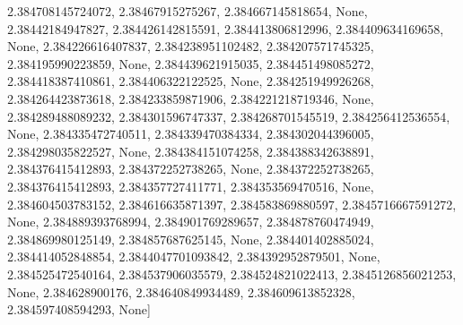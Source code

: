 \documentclass[
  11pt,
  french,
]{article}
\begin{document}
\begin{tcolorbox}[title= Répartition des volumes selon leurs caractéristiques ,colback=boitecode]
2.384708145724072, 2.38467915275267, 2.384667145818654, None, 2.38442184947827, 2.384426142815591, 2.384413806812996, 2.384409634169658, None, 2.384226616407837, 2.384238951102482, 2.384207571745325, 2.384195990223859, None, 2.384439621915035, 2.384451498085272, 2.384418387410861, 2.384406322122525, None, 2.384251949926268, 2.384264423873618, 2.384233859871906, 2.384221218719346, None, 2.384289488089232, 2.384301596747337, 2.384268701545519, 2.384256412536554, None, 2.384335472740511, 2.384339470384334, 2.384302044396005, 2.384298035822527, None, 2.384384151074258, 2.384388342638891, 2.384376415412893, 2.384372252738265, None, 2.384372252738265, 2.384376415412893, 2.384357727411771, 2.384353569470516, None, 2.384604503783152, 2.384616635871397, 2.384583869880597, 2.3845716667591272, None, 2.384889393768994, 2.384901769289657, 2.384878760474949, 2.384869980125149, 2.384857687625145, None, 2.384401402885024, 2.384414052848854, 2.3844047701093842, 2.384392952879501, None, 2.384525472540164, 2.384537906035579, 2.384524821022413, 2.3845126856021253, None, 2.384628900176, 2.384640849934489, 2.384609613852328, 2.384597408594293, None]

\end{tcolorbox}
\end{document}

